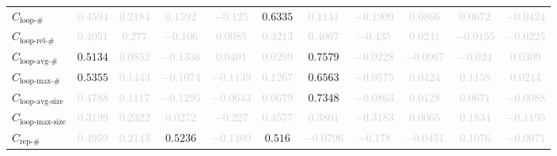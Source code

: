 \documentclass{standalone}
\newcommand{\loopnumname}{\text{loop-\#}}
\newcommand{\loopnum}{C_{\loopnumname}}
\newcommand{\looprelnumname}{\text{loop-rel-\#}}
\newcommand{\looprelnum}{C_{\looprelnumname}}
\newcommand{\loopavgname}{\text{loop-avg-\#}}
\newcommand{\loopavg}{C_{\loopavgname}}
\newcommand{\loopmaxname}{\text{loop-max-\#}}
\newcommand{\loopmax}{C_{\loopmaxname}}
\newcommand{\loopavgsizename}{\text{loop-avg-size}}
\newcommand{\loopavgsize}{C_{\loopavgsizename}}
\newcommand{\loopmaxsizename}{\text{loop-max-size}}
\newcommand{\loopmaxsize}{C_{\loopmaxsizename}}
\newcommand{\repnumname}{\text{rep-\#}}
\newcommand{\repnum}{C_{\repnumname}}
\begin{document}
\begin{tabular}{lcccccccccc}
$\loopnum$ & \textcolor{lightgray}{$0.4594$} & \textcolor{lightgray}{$0.2184$} & \textcolor{lightgray}{$0.1592$} & \textcolor{lightgray}{$-0.125$} & $0.6335$ & \textcolor{lightgray}{$0.1141$} & \textcolor{lightgray}{$-0.1909$} & \textcolor{lightgray}{$0.0866$} & \textcolor{lightgray}{$0.0672$} & \textcolor{lightgray}{$-0.0424$} \\ 
$\looprelnum$ & \textcolor{lightgray}{$0.4051$} & \textcolor{lightgray}{$0.277$} & \textcolor{lightgray}{$-0.106$} & \textcolor{lightgray}{$0.0085$} & \textcolor{lightgray}{$0.3213$} & \textcolor{lightgray}{$0.4067$} & \textcolor{lightgray}{$-0.435$} & \textcolor{lightgray}{$0.0241$} & \textcolor{lightgray}{$-0.0155$} & \textcolor{lightgray}{$-0.0225$} \\ 
$\loopavg$ & $0.5134$ & \textcolor{lightgray}{$0.0852$} & \textcolor{lightgray}{$-0.1336$} & \textcolor{lightgray}{$0.0401$} & \textcolor{lightgray}{$0.0299$} & $0.7579$ & \textcolor{lightgray}{$-0.0228$} & \textcolor{lightgray}{$-0.0067$} & \textcolor{lightgray}{$-0.024$} & \textcolor{lightgray}{$0.0309$} \\ 
$\loopmax$ & $0.5355$ & \textcolor{lightgray}{$0.1443$} & \textcolor{lightgray}{$-0.1074$} & \textcolor{lightgray}{$-0.1139$} & \textcolor{lightgray}{$0.1267$} & $0.6563$ & \textcolor{lightgray}{$-0.0575$} & \textcolor{lightgray}{$0.0424$} & \textcolor{lightgray}{$0.1158$} & \textcolor{lightgray}{$0.0214$} \\ 
$\loopavgsize$ & \textcolor{lightgray}{$0.4788$} & \textcolor{lightgray}{$0.1117$} & \textcolor{lightgray}{$-0.1295$} & \textcolor{lightgray}{$-0.0643$} & \textcolor{lightgray}{$0.0679$} & $0.7348$ & \textcolor{lightgray}{$-0.0863$} & \textcolor{lightgray}{$0.0128$} & \textcolor{lightgray}{$0.0671$} & \textcolor{lightgray}{$-0.0088$} \\ 
$\loopmaxsize$ & \textcolor{lightgray}{$0.3199$} & \textcolor{lightgray}{$0.2322$} & \textcolor{lightgray}{$0.0272$} & \textcolor{lightgray}{$-0.227$} & \textcolor{lightgray}{$0.4577$} & \textcolor{lightgray}{$0.3801$} & \textcolor{lightgray}{$-0.3183$} & \textcolor{lightgray}{$0.0065$} & \textcolor{lightgray}{$0.1834$} & \textcolor{lightgray}{$-0.1195$} \\ 
$\repnum$ & \textcolor{lightgray}{$0.4959$} & \textcolor{lightgray}{$0.2143$} & $0.5236$ & \textcolor{lightgray}{$-0.1409$} & $0.516$ & \textcolor{lightgray}{$-0.0796$} & \textcolor{lightgray}{$-0.178$} & \textcolor{lightgray}{$-0.0451$} & \textcolor{lightgray}{$0.1076$} & \textcolor{lightgray}{$-0.0071$} \\ 

\end{tabular}
\end{document}
